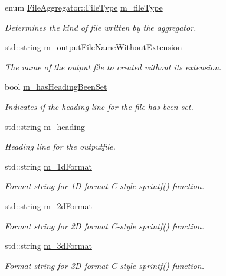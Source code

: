 \begin{DoxyCompactItemize}
enum \hyperlink{classns3_1_1FileAggregator_aedb3108205a498f7ac0c564508067e2d}{File\+Aggregator\+::\+File\+Type} \hyperlink{classns3_1_1FileHelper_a3bd3c31ac1083d2bee0b0987b0a1323f}{m\+\_\+file\+Type}
\begin{DoxyCompactList}\small\item\em Determines the kind of file written by the aggregator. \end{DoxyCompactList}\item 
std\+::string \hyperlink{classns3_1_1FileHelper_a65ce7e46c43b018fe5e648d179e7b52e}{m\+\_\+output\+File\+Name\+Without\+Extension}
\begin{DoxyCompactList}\small\item\em The name of the output file to created without its extension. \end{DoxyCompactList}\item 
bool \hyperlink{classns3_1_1FileHelper_a83e6bfa9d7f2ba769dee7d2b610f957d}{m\+\_\+has\+Heading\+Been\+Set}
\begin{DoxyCompactList}\small\item\em Indicates if the heading line for the file has been set. \end{DoxyCompactList}\item 
std\+::string \hyperlink{classns3_1_1FileHelper_a60cc5ac5116788fd230701dc1b9d0441}{m\+\_\+heading}
\begin{DoxyCompactList}\small\item\em Heading line for the outputfile. \end{DoxyCompactList}\item 
std\+::string \hyperlink{classns3_1_1FileHelper_a9877a5e9438edfec61858113110022e3}{m\+\_\+1d\+Format}
\begin{DoxyCompactList}\small\item\em Format string for 1D format C-\/style sprintf() function. \end{DoxyCompactList}\item 
std\+::string \hyperlink{classns3_1_1FileHelper_a8723c77fccac8c1464c45a50244af942}{m\+\_\+2d\+Format}
\begin{DoxyCompactList}\small\item\em Format string for 2D format C-\/style sprintf() function. \end{DoxyCompactList}\item 
std\+::string \hyperlink{classns3_1_1FileHelper_ad1fde05299cc3d892f38844e38cd902f}{m\+\_\+3d\+Format}
\begin{DoxyCompactList}\small\item\em Format string for 3D format C-\/style sprintf() function. \end{DoxyCompactList}\item 

\end{DoxyCompactItemize}
